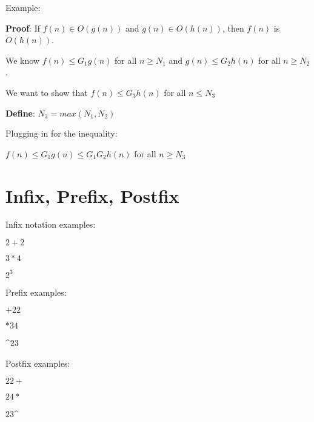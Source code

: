 \documentclass[11pt,a4paper,english]{paper}
\begin{document}
\begin{bbox}{Example:} {

    \textbf{Proof}: If $f(n) \in O(g(n))$ and $g(n) \in O(h(n))$, then $f(n)$ is $O(h(n))$.

    \bigskip 

    We know $f(n) \leq G_{1}g(n)$ for all $n \geq N_{1}$ and $g(n) \leq G_{2}h(n)$ for all $n \geq N_{2}$.

    We want to show that $f(n) \leq G_{3}h(n)$ for all $n \leq N_{3}$

    \bigskip

    \textbf{Define}: $N_{3} = max(N_1, N_2)$

    Plugging in for the inequality:

    \bigskip

    \center $f(n) \leq G_{1}g(n) \leq G_{1}G_{2}h(n)$ for all $n \geq N_{3}$


}\end{bbox}

\section{Infix, Prefix, Postfix}

Infix notation examples:

\begin{itemize} {

    \item $2+2$
    \item $3*4$
    \item $2^3$

}\end{itemize}

\bigskip
\noindent Prefix examples:

\begin{itemize} {

  \item $+22$
  \item $*34$
  \item \^{}$23$

}\end{itemize}

\bigskip

\noindent Postfix examples:
\begin{itemize} {

  \item $22+$
  \item $24*$
  \item $23$\^{}

}\end{itemize}
\end{document}
